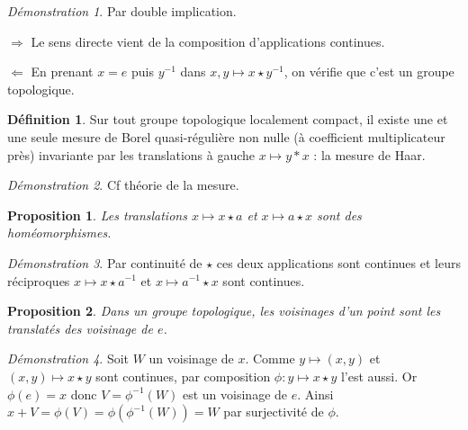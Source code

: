 \documentclass[a4paper, 11pt, french]{book}
\newenvironment{itemise}{\itemize}{\enditemize}
\theoremstyle{plain} %
\newtheorem{proposition}{Proposition}
\theoremstyle{definition} %
\newtheorem{definition}{Définition}
\theoremstyle{remark} %
\newtheorem*{demonstration}{Démonstration}
\newcommand{\1}{\mathds{1}}
\newcommand{\inv}[1]{#1^{-1}}
\begin{document}
\begin{demonstration}
	Par double implication.
	\begin{itemise}
		\item[$\Rightarrow$] Le sens directe vient de la composition d'applications continues.
		\item[$\Leftarrow$] En prenant $x=e$ puis $\inv{y}$ dans $x, y\longmapsto x\star\inv{y}$, on vérifie que c'est un groupe topologique.
	\end{itemise}
\end{demonstration}


\begin{definition}
	Sur tout groupe topologique localement compact, il existe une et une seule mesure de Borel quasi-régulière non nulle (à coefficient multiplicateur près) invariante par les translations à gauche $x\longmapsto y*x$ : la mesure de Haar.
\end{definition}

\begin{demonstration}
	Cf théorie de la mesure.
\end{demonstration}

\begin{proposition}
	Les translations $x\longmapsto x\star a$ et $x\longmapsto a\star x$ sont des homéomorphismes.
\end{proposition}

\begin{demonstration}
	Par continuité de $\star$ ces deux applications sont continues et leurs réciproques $x\longmapsto x\star\inv{a}$ et $x\longmapsto\inv{a}\star x$ sont continues.
\end{demonstration}

\begin{proposition}
	Dans un groupe topologique, les voisinages d’un point sont les translatés des voisinage de $e$.
\end{proposition}

\begin{demonstration}
	Soit $W$ un voisinage de $x$.
	Comme $y\longmapsto(x, y)$ et $(x, y)\longmapsto x\star y$ sont continues, par composition $\phi:y\longmapsto x\star y$ l'est aussi.
	Or $\phi(e)=x$ donc $V=\inv{\phi}(W)$ est un voisinage de $e$.
	Ainsi $x+V=\phi(V)=\phi(\inv{\phi}(W))=W$ par surjectivité de $\phi$.
\end{demonstration}
\end{document}
